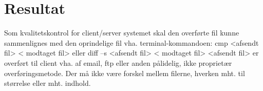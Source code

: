\chapter{Resultat}

Som kvalitetskontrol for client/server systemet skal den overførte fil kunne
sammenlignes med den oprindelige fil vha. terminal-kommandoen:
cmp <afsendt fil> < modtaget fil>
eller
diff –s <afsendt fil> < modtaget fil>
<afsendt fil> er overført til client vha. af email, ftp eller anden pålidelig, ikke
proprietær overføringsmetode.
Der må ikke være forskel mellem filerne, hverken mht. til størrelse eller mht. indhold.
